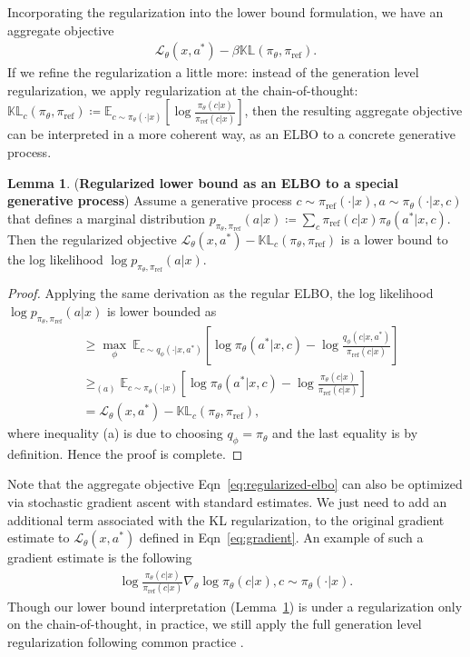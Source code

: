 \documentclass{article}
\theoremstyle{definition}
\newtheorem{lemma}[theorem]{Lemma}
\begin{document}
Incorporating the regularization into the lower bound formulation, we have an aggregate objective
\begin{align}
     \mathcal{L}_{\theta}(x,a^*) - \beta\mathbb{KL}(\pi_\theta,\pi_\text{ref}).\label{eq:regularized-elbo}
\end{align}
If we refine the regularization a little more: instead of the generation level regularization, we apply regularization at the chain-of-thought: $\mathbb{KL}_c\left(\pi_\theta,\pi_\text{ref}\right)\coloneqq\mathbb{E}_{c\sim\pi_\theta(\cdot|x)}\left[\log\frac{\pi_\theta(c|x)}{\pi_\text{ref}(c|x)}\right]$, then the resulting aggregate objective can be interpreted in a more coherent way, as an ELBO to a concrete generative process.
\begin{lemma}\label{lemma:regularized}
    (\textbf{Regularized lower bound as an ELBO to a special generative process}) Assume a generative process $c\sim \pi_\text{ref}(\cdot|x),a\sim \pi_\theta(\cdot|x,c)$ that defines a marginal distribution $p_{\pi_\theta,\pi_\text{ref}}(a|x)\coloneqq \sum_c \pi_\text{ref}(c|x)\pi_\theta(a^*|x,c)$. Then the regularized objective $\mathcal{L}_{\theta}(x,a^*) - \mathbb{KL}_c(\pi_\theta,\pi_\text{ref})$ is a lower bound to the log likelihood $\log p_{\pi_\theta,\pi_\text{ref}}(a|x)$.
\end{lemma}
\begin{proof}
    Applying the same derivation as the regular ELBO, the log likelihood $\log p_{\pi_\theta,\pi_\text{ref}}(a|x)$ is lower bounded as
    \begin{align*}
         &\geq \max_\phi\  \mathbb{E}_{c\sim q_\phi(\cdot|x,a^\ast)}\left[\log \pi_\theta(a^\ast|x,c) - \log \frac{q_\phi(c|x,a^*)}{\pi_\text{ref}(c|x)} \right]  \\
        &\geq_{(a)} \mathbb{E}_{c\sim \pi_\theta(\cdot|x)}\left[\log \pi_\theta(a^\ast|x,c) - \log \frac{\pi_\theta(c|x)}{\pi_\text{ref}(c|x)} \right] \\
        &= \mathcal{L}_{\theta}(x,a^*) - \mathbb{KL}_c(\pi_\theta,\pi_\text{ref}),
    \end{align*}
where inequality (a) is due to choosing $q_\phi=\pi_\theta$ and the last equality is by definition. Hence the proof is complete.
\end{proof}

Note that the aggregate objective Eqn~\eqref{eq:regularized-elbo} can also be optimized via stochastic gradient ascent with standard estimates. We just need to add an additional term associated with the KL regularization, to the original gradient estimate to $\mathcal{L}_\theta(x,a^*)$ defined in Eqn~\eqref{eq:gradient}. An example of such a gradient estimate is the following
\begin{align*}
    \log \frac{\pi_\theta(c|x)}{\pi_\text{ref}(c|x)}\nabla_\theta \log \pi_\theta(c|x),c\sim \pi_\theta(\cdot|x).
\end{align*}
Though our lower bound interpretation (Lemma~\ref{lemma:regularized}) is under a regularization only on the chain-of-thought, in practice, we still apply the full generation level regularization following common practice \citep{christiano2017deep,ziegler2019fine,ouyang2022training}.
\end{document}
